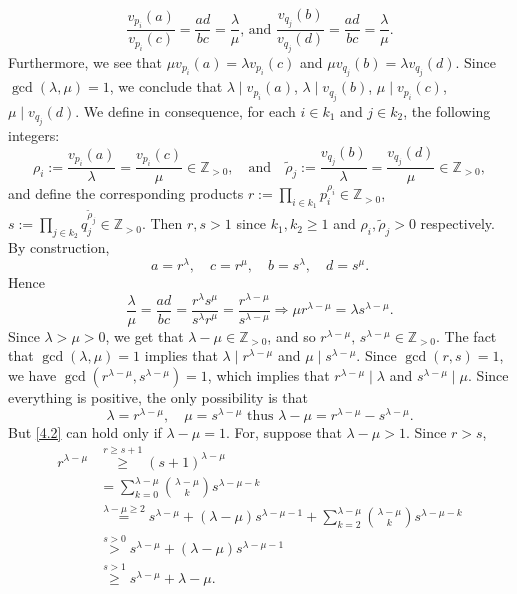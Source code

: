 \documentclass[11pt, a4paper, oneside]{article}
\theoremstyle{remark}
\theoremstyle{lemma}
\begin{document}
\[
\frac{v_{p_i}(a)}{v_{p_i}(c)} = \frac{ad}{bc} = \frac{\lambda}{\mu} \text{, and } \frac{v_{q_j}(b)}{v_{q_j}(d)} = \frac{ad}{bc} = \frac{\lambda}{\mu}.
\]
Furthermore, we see that \( \mu v_{p_i}(a) = \lambda v_{p_i}(c) \) and \( \mu v_{q_j}(b) = \lambda v_{q_j}(d) \). Since \( \gcd(\lambda, \mu) = 1 \), we conclude that \( \lambda \mid v_{p_i}(a) \), \( \lambda \mid v_{q_j}(b) \), \( \mu \mid v_{p_i}(c) \), \( \mu \mid v_{q_j}(d) \). We define in consequence, for each \( i \in k_1 \) and \( j \in k_2 \), the following integers:
\[
    \rho_i := \frac{v_{p_i}(a)}{\lambda} = \frac{v_{p_i}(c)}{\mu} \in \mathbb{Z}_{>0},\quad \text{and} \quad \tilde{\rho}_j := \frac{v_{q_j}(b)}{\lambda} = \frac{v_{q_j}(d)}{\mu} \in \mathbb{Z}_{>0},
\]
and define the corresponding products \( r := \prod_{i \in k_1} p_i^{\rho_i} \in \mathbb{Z}_{>0} \), \( s := \prod_{j \in k_2} q_j^{\tilde{\rho}_j} \in \mathbb{Z}_{>0} \). Then \( r, s > 1 \) since \( k_1, k_2 \geq 1 \) and \( \rho_i, \tilde{\rho}_j > 0 \) respectively. By construction,
\[
    a = r^\lambda,\quad c = r^\mu,\quad b = s^\lambda,\quad d = s^\mu.
\]
Hence
\[
    \frac{\lambda}{\mu} = \frac{ad}{bc} = \frac{r^{\lambda}s^{\mu}}{s^{\lambda}r^{\mu}} = \frac{r^{\lambda - \mu}}{s^{\lambda - \mu}} \Rightarrow \mu r^{\lambda - \mu} = \lambda s^{\lambda - \mu}.
\]
Since \( \lambda > \mu > 0 \), we get that \( \lambda - \mu \in \mathbb{Z}_{>0} \), and so \( r^{\lambda - \mu},\, s^{\lambda - \mu} \in \mathbb{Z}_{>0} \). The fact that \( \gcd(\lambda, \mu) = 1 \) implies that \( \lambda \mid r^{\lambda - \mu} \) and \( \mu \mid s^{\lambda - \mu} \). Since \( \gcd(r, s) = 1 \), we have \( \gcd\left(r^{\lambda - \mu}, s^{\lambda - \mu}\right) = 1 \), which implies that \( r^{\lambda - \mu} \mid \lambda \) and \( s^{\lambda - \mu} \mid \mu \). Since everything is positive, the only possibility is that
\begin{equation} \label{4.2}
    \lambda = r^{\lambda - \mu}, \quad \mu = s^{\lambda - \mu} \text{ thus } \lambda - \mu = r^{\lambda - \mu} - s^{\lambda - \mu}.
\end{equation}
But \eqref{4.2} can hold only if \( \lambda - \mu = 1 \). For, suppose that \( \lambda - \mu > 1 \). Since \( r > s \),
\begin{align*}
    r^{\lambda - \mu} &\overset{r \geq s + 1}{\geq} (s + 1)^{\lambda - \mu} \\
    &= \sum_{k = 0}^{\lambda - \mu} \binom{\lambda - \mu}{k} s^{\lambda - \mu - k} \\
    &\overset{\lambda - \mu \geq 2}{=} s^{\lambda - \mu} + (\lambda - \mu) s^{\lambda - \mu - 1} + \sum_{k = 2}^{\lambda - \mu} \binom{\lambda - \mu}{k} s^{\lambda - \mu - k} \\
    &\overset{s > 0}{>} s^{\lambda - \mu} + (\lambda - \mu) s^{\lambda - \mu - 1} \\
    &\overset{s > 1}{\geq} s^{\lambda - \mu} + \lambda - \mu.
\end{align*}
\end{document}
